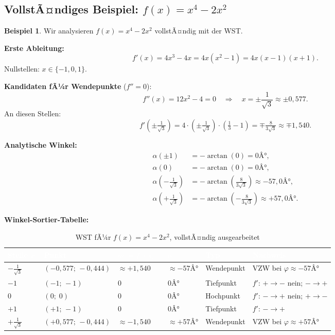 ﻿\documentclass[12pt, a4paper]{article}
\theoremstyle{definition}
\newtheorem{beispiel}{Beispiel}[section]
\begin{document}
	\subsection{VollstÃ¤ndiges Beispiel: $f(x) = x^4 - 2x^2$}
	
	\begin{beispiel}
		Wir analysieren $f(x) = x^4 - 2x^2$ vollstÃ¤ndig mit der WST.
		
		\textbf{Erste Ableitung:}
		\[
		f'(x) = 4x^3 - 4x = 4x(x^2 - 1) = 4x(x-1)(x+1).
		\]
		Nullstellen: $x \in \{-1, 0, 1\}$.
		
		\textbf{Kandidaten fÃ¼r Wendepunkte} ($f'' = 0$):
		\[
		f''(x) = 12x^2 - 4 = 0 \quad\Rightarrow\quad x = \pm\frac{1}{\sqrt{3}} \approx \pm 0{,}577.
		\]
		An diesen Stellen:
		\[
		f'\!\left(\pm\tfrac{1}{\sqrt{3}}\right)
		= 4\cdot\left(\pm\tfrac{1}{\sqrt{3}}\right)\!\cdot\!\left(\tfrac{1}{3}-1\right)
		= \mp\tfrac{8}{3\sqrt{3}} \approx \mp 1{,}540.
		\]
		
		\textbf{Analytische Winkel:}
		\begin{align*}
			\alpha(\pm 1) &= -\arctan(0) = 0Â°, \\
			\alpha(0)     &= -\arctan(0) = 0Â°, \\
			\alpha\!\left(-\tfrac{1}{\sqrt{3}}\right) &= -\arctan\!\left(\tfrac{8}{3\sqrt{3}}\right) \approx -57{,}0Â°, \\
			\alpha\!\left(+\tfrac{1}{\sqrt{3}}\right) &= -\arctan\!\left(-\tfrac{8}{3\sqrt{3}}\right) \approx +57{,}0Â°.
		\end{align*}
		
		\textbf{Winkel-Sortier-Tabelle:}
		
		\begin{table}[H]
			\centering
			\caption{WST fÃ¼r $f(x) = x^4 - 2x^2$, vollstÃ¤ndig ausgearbeitet}
			\renewcommand{\arraystretch}{1.55}
			\begin{tabular}{C{1.5cm} C{2.7cm} C{2.2cm} C{2.2cm} C{2.4cm} L{2.5cm}}
				\toprule
				\textcolor{white}{\textbf{Stelle $x_i$}} &
				\textcolor{white}{\textbf{Punkt}} &
				\textcolor{white}{\textbf{$m_i = f'(x_i)$}} &
				\textcolor{white}{\textbf{$\alpha_i$}} &
				\textcolor{white}{\textbf{Typ}} &
				\textcolor{white}{\textbf{Nachweis}} \\
				\midrule
				$-\frac{1}{\sqrt{3}}$ & $(-0{,}577;\,-0{,}444)$ & $\approx+1{,}540$ & $\approx -57Â°$ & Wendepunkt & VZW bei $\varphi\approx -57Â°$ \\
				$-1$ & $(-1;\,-1)$ & $0$ & $0Â°$ & Tiefpunkt & $f'$: $+\to -$ nein; $-\to +$ \\
				$0$ & $(0;\;0)$ & $0$ & $0Â°$ & Hochpunkt & $f'$: $-\to +$ nein; $+\to -$ \\
				$+1$ & $(+1;\,-1)$ & $0$ & $0Â°$ & Tiefpunkt & $f'$: $-\to +$ \\
				$+\frac{1}{\sqrt{3}}$ & $(+0{,}577;\,-0{,}444)$ & $\approx-1{,}540$ & $\approx +57Â°$ & Wendepunkt & VZW bei $\varphi\approx +57Â°$ \\
				\bottomrule
			\end{tabular}
		\end{table}
		

\end{beispiel}
\end{document}
